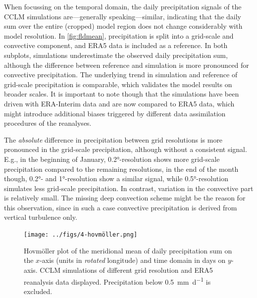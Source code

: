 When focussing on the temporal domain, the daily precipitation signals of the CCLM simulations are---generally speaking---similar, indicating that the daily sum over the entire (cropped) model region does not change considerably with model resolution. In \cref{fig:fldmean}, precipitation is split into a grid-scale and convective component, and ERA5 data is included as a reference.
In both subplots, simulations underestimate the observed daily precipitation sum, although the difference between reference and simulation is more pronounced for convective precipitation. The underlying trend in simulation and reference of grid-scale precipitation is comparable, which validates the model results on broader scales. It is important to note though that the simulations have been driven with ERA-Interim data and are now compared to ERA5 data, which might introduce additional biases triggered by different data assimilation procedures of the reanalyses.

The \textit{absolute} difference in precipitation between grid resolutions is more pronounced in the grid-scale precipitation, although without a consistent signal. E.g., in the beginning of January, 0.2°-resolution shows more grid-scale precipitation compared to the remaining resolutions, in the end of the month though, 0.2°- and 1°-resolution show a similar signal, while 0.5°-resolution simulates less grid-scale precipitation. In contrast, variation in the convective part is relatively small. The missing deep convection scheme might be the reason for this observation, since in such a case convective precipitation is derived from vertical turbulence only.

\begin{figure}
	\centering
	\texttt{[image: ../figs/4-hovmöller.png]}
	\caption{Hovmöller plot of the meridional mean of daily precipitation sum on the \(x\)-axis (units in \textit{rotated} longitude) and time domain in days on \(y\)-axis. CCLM simulations of different grid resolution and ERA5 reanalysis data displayed. Precipitation below \SI{0.5}{\mm\per\day} is excluded.}
	\label{fig:hovmöller}
\end{figure}

